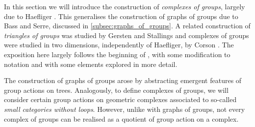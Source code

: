 In this section we will introduce the construction of \emph{complexes of groups}, largely due to Haefliger \cite{haefliger_complexes_1991}.
This generalises the construction of graphs of groups due to Bass and Serre, discussed in \cref{subsec:graphs_of_groups}.
A related construction of \emph{triangles of groups} was studied by Gersten and Stallings \cite{stallings_nonpositively_1991} and complexes of groups were studied in two dimensions, independently of Haefliger, by Corson \cite{corson_complexes_1992}.
The exposition here largely follows the beginning of \cite[Chapter 3.\textrm{\ensuremath{\calc}}]{BrHa11}, with some modification to notation and with some elements explored in more detail.

The construction of graphs of groups arose by abstracting emergent features of group actions on trees.
Analogously, to define complexes of groups, we will consider certain group actions on geometric complexes associated to so-called \emph{small categories without loops}.
However, unlike with graphs of groups, not every complex of groups can be realised as a quotient of group action on a complex.

